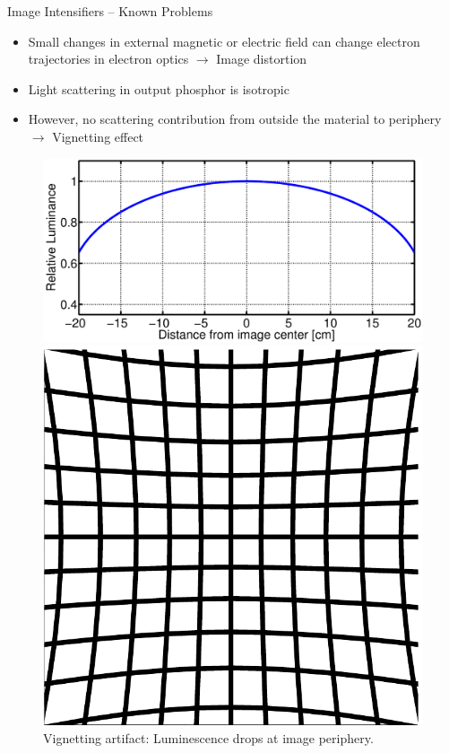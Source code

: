 \begin{frame}{Image Intensifiers -- Known Problems}
    \begin{itemize}
        \item  Small changes in external magnetic or electric field can change electron trajectories in electron optics $\rightarrow$ Image distortion
        \item  Light scattering in output phosphor is isotropic
        \item  However, no scattering contribution from outside the material to periphery $\rightarrow$ Vignetting effect
    \end{itemize}
    \vspace{-0.4cm}
    \begin{figure}[tb]%
        \centering
        \begin{minipage}[t]{0.448\columnwidth}
            \includegraphics[width=1\columnwidth]{images/Vignetting}\vspace{-0.2cm}%
            \caption{Vignetting artifact: Luminescence drops at image periphery.}
        \end{minipage}
        \hspace{0.06\columnwidth}
        \begin{minipage}[t]{0.272\columnwidth}
            \includegraphics[width=0.85\columnwidth]{images/Distortion}\vspace{-0cm}%

\end{minipage}
\end{figure}
\end{frame}
